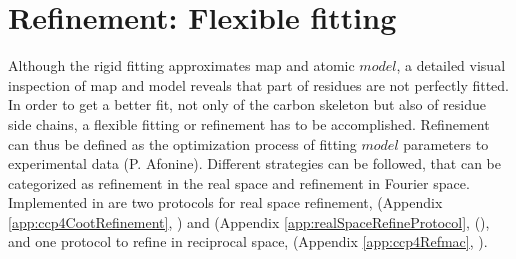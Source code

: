 \section{Refinement: Flexible fitting}

Although the rigid fitting approximates map and atomic $model$, a detailed visual inspection of map and model reveals that part of residues are not perfectly fitted. In order to get a better fit, not only of the carbon skeleton but also of residue side chains, a flexible fitting or refinement has to be accomplished. Refinement can thus be defined as the optimization process of fitting $model$ parameters to experimental data (P. Afonine). Different strategies can be followed, that can be categorized as refinement in the real space and refinement in Fourier space. Implemented in \scipion are two protocols for real space refinement,  (Appendix \ref{app:ccp4CootRefinement}, \citep{emsley2010}) and  (Appendix \ref{app:realSpaceRefineProtocol}, (\citep{afonine2018}), and one protocol to refine in reciprocal space,  (Appendix \ref{app:ccp4Refmac}, \citep{vagin2004}).

